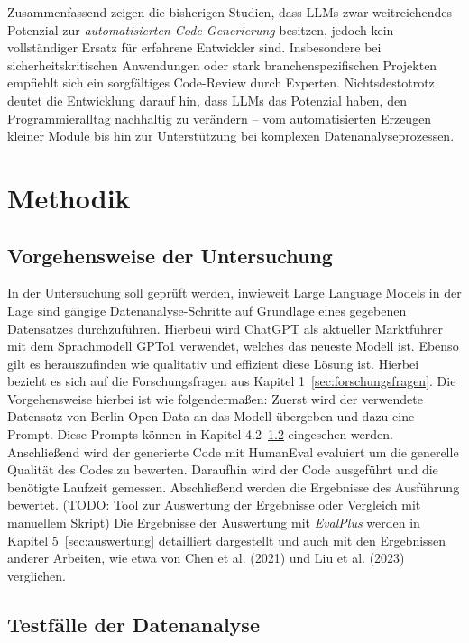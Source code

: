 \documentclass[11pt,a4paper]{article}
\begin{document}
Zusammenfassend zeigen die bisherigen Studien, dass LLMs zwar weitreichendes Potenzial zur \emph{automatisierten Code-Generierung} besitzen, jedoch kein vollständiger Ersatz für erfahrene Entwickler sind. Insbesondere bei sicherheitskritischen Anwendungen oder stark branchenspezifischen Projekten empfiehlt sich ein sorgfältiges Code-Review durch Experten. Nichtsdestotrotz deutet die Entwicklung darauf hin, dass LLMs das Potenzial haben, den Programmieralltag nachhaltig zu verändern – vom automatisierten Erzeugen kleiner Module bis hin zur Unterstützung bei komplexen Datenanalyseprozessen.

\section{Methodik}
\label{sec:methodik}
\subsection{Vorgehensweise der Untersuchung}
    In der Untersuchung soll geprüft werden, inwieweit Large Language Models in der Lage sind gängige Datenanalyse-Schritte auf Grundlage eines gegebenen Datensatzes durchzuführen. Hierbeui wird ChatGPT als aktueller Marktführer mit dem Sprachmodell GPTo1 verwendet, welches das neueste Modell ist. Ebenso gilt es herauszufinden wie qualitativ und effizient diese Lösung ist. Hierbei bezieht es sich auf die Forschungsfragen aus Kapitel 1~\ref{sec:forschungsfragen}.
    Die Vorgehensweise hierbei ist wie folgendermaßen: Zuerst wird der verwendete Datensatz von Berlin Open Data an das Modell übergeben und dazu eine Prompt. Diese Prompts können in Kapitel 4.2~\ref{sec:testfaelle} eingesehen werden. Anschließend wird der generierte Code mit HumanEval evaluiert um die generelle Qualität des Codes zu bewerten. Daraufhin wird der Code ausgeführt und die benötigte Laufzeit gemessen. Abschließend werden die Ergebnisse des Ausführung bewertet. (TODO: Tool zur Auswertung der Ergebnisse oder Vergleich mit manuellem Skript)
    Die Ergebnisse der Auswertung mit \emph{EvalPlus}\cite{evalplus} werden in Kapitel 5~\ref{sec:auswertung} detailliert dargestellt und auch mit den Ergebnissen anderer Arbeiten, wie etwa von Chen et al. (2021)\cite{chen2021evaluatinglargelanguagemodels} und Liu et al. (2023)\cite{NEURIPS2023_43e9d647} verglichen.

\subsection{Testfälle der Datenanalyse}
\label{sec:testfaelle}
\end{document}
